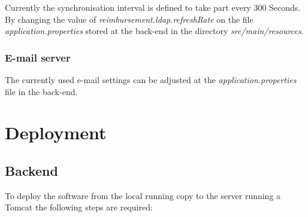 Currently the synchronisation interval is defined to take part every 300 Seconds. By changing the value of \textit{reimbursement.ldap.refreshRate} on the file \textit{application.properties} stored at the back-end in the directory \textit{src/main/resources}. 

\subsubsection{E-mail server}
\label{subsubsec:email}

The currently used e-mail settings can be adjusted at the \textit{application.properties} file in the back-end.

\section{Deployment}

\subsection{Backend}

To deploy the software from the local running copy to the server running a Tomcat the following steps are required:

